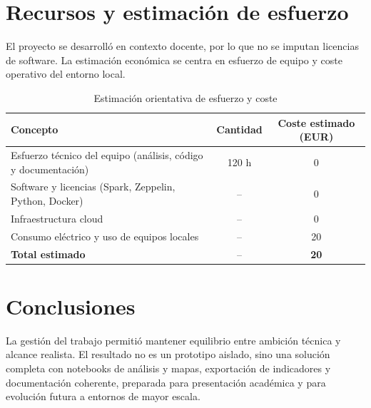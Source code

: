 \section{Recursos y estimación de esfuerzo}
El proyecto se desarrolló en contexto docente, por lo que no se imputan licencias
de software. La estimación económica se centra en esfuerzo de equipo y coste operativo
del entorno local.

\begin{table}[H]
	\centering
	\caption{Estimación orientativa de esfuerzo y coste}
	\begin{tabular}{|p{6.8cm}|c|c|}
		\hline
		\textbf{Concepto} & \textbf{Cantidad} & \textbf{Coste estimado (EUR)} \\
		\hline
		Esfuerzo técnico del equipo (análisis, código y documentación) & 120 h & 0 \\
		\hline
		Software y licencias (Spark, Zeppelin, Python, Docker) & -- & 0 \\
		\hline
		Infraestructura cloud & -- & 0 \\
		\hline
		Consumo eléctrico y uso de equipos locales & -- & 20 \\
		\hline
		\textbf{Total estimado} & -- & \textbf{20} \\
		\hline
	\end{tabular}
\end{table}

\section{Conclusiones}
La gestión del trabajo permitió mantener equilibrio entre ambición técnica y alcance
realista. El resultado no es un prototipo aislado, sino una solución completa con
notebooks de análisis y mapas, exportación de indicadores y documentación coherente,
preparada para presentación académica y para evolución futura a entornos de mayor
escala.